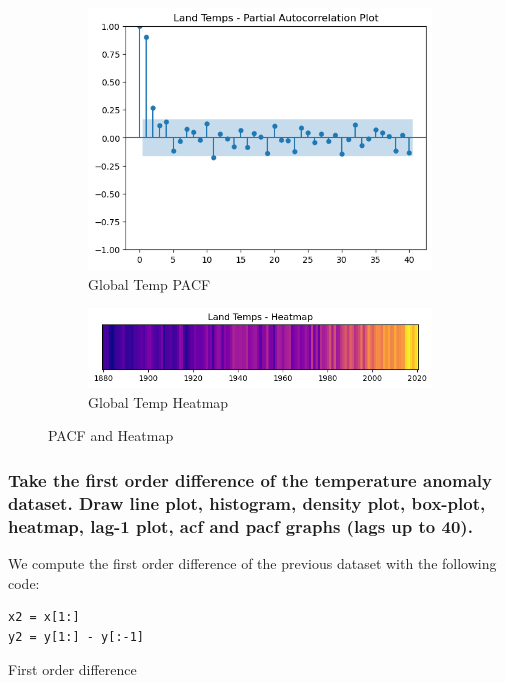 \documentclass{article}
\begin{document}
\begin{figure}[htbp]
  \centering
  \begin{subfigure}[b]{0.45\textwidth}
    \includegraphics[width=\textwidth]{img/global_temp/pacf.png}
    \caption{Global Temp PACF}
    \label{fig:global_pacf}
  \end{subfigure}
  \hfill
  \begin{subfigure}[b]{0.45\textwidth}
    \includegraphics[width=\textwidth]{img/global_temp/heatmap.png}
    \caption{Global Temp Heatmap}
    \label{fig:global_heatmap}
  \end{subfigure}
  \caption{PACF and Heatmap}
  \label{fig:global_temp4}
\end{figure}

\subsubsection{Take the first order difference of the temperature anomaly dataset. Draw line plot,
 histogram, density plot, box-plot, heatmap, lag-1 plot, acf and pacf graphs (lags up
 to 40).}

 We compute the first order difference of the previous dataset with the following code:
\begin{listing}[!ht]
\begin{verbatim}
x2 = x[1:]
y2 = y[1:] - y[:-1]
\end{verbatim}
\caption{First order difference}
\label{listing:gen_dt}
\end{listing}
\end{document}
